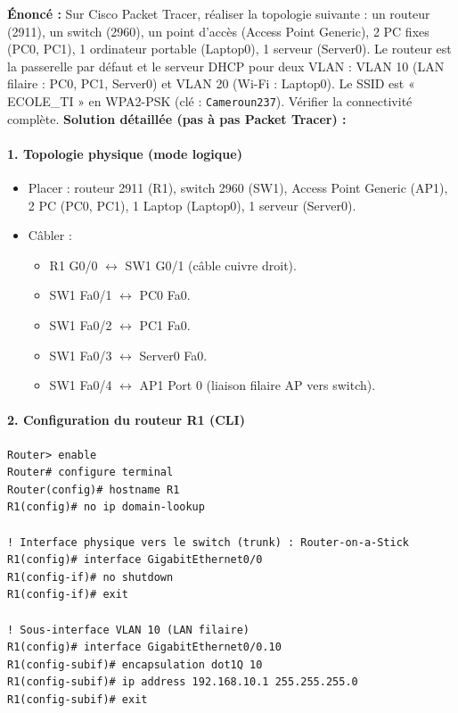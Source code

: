 \documentclass[11pt]{article}
\begin{document}
\begin{exoresolu}
\textbf{Énoncé :} Sur Cisco Packet Tracer, réaliser la topologie suivante : un routeur (2911), un switch (2960), un point d'accès (Access Point Generic), 2 PC fixes (PC0, PC1), 1 ordinateur portable (Laptop0), 1 serveur (Server0). Le routeur est la passerelle par défaut et le serveur DHCP pour deux VLAN : VLAN 10 (LAN filaire : PC0, PC1, Server0) et VLAN 20 (Wi-Fi : Laptop0). Le SSID est « ECOLE\_TI » en WPA2-PSK (clé : \texttt{Cameroun237}). Vérifier la connectivité complète.
\tcblower
\textbf{Solution détaillée (pas à pas Packet Tracer) :}

\paragraph{1. Topologie physique (mode logique)}
\begin{itemize}
    \item Placer : routeur 2911 (R1), switch 2960 (SW1), Access Point Generic (AP1), 2 PC (PC0, PC1), 1 Laptop (Laptop0), 1 serveur (Server0).
    \item Câbler :
    \begin{itemize}
        \item R1 G0/0 $\leftrightarrow$ SW1 G0/1 (câble cuivre droit).
        \item SW1 Fa0/1 $\leftrightarrow$ PC0 Fa0.
        \item SW1 Fa0/2 $\leftrightarrow$ PC1 Fa0.
        \item SW1 Fa0/3 $\leftrightarrow$ Server0 Fa0.
        \item SW1 Fa0/4 $\leftrightarrow$ AP1 Port 0 (liaison filaire AP vers switch).
    \end{itemize}
\end{itemize}

\paragraph{2. Configuration du routeur R1 (CLI)}
\begin{lstlisting}
Router> enable
Router# configure terminal
Router(config)# hostname R1
R1(config)# no ip domain-lookup

! Interface physique vers le switch (trunk) : Router-on-a-Stick
R1(config)# interface GigabitEthernet0/0
R1(config-if)# no shutdown
R1(config-if)# exit

! Sous-interface VLAN 10 (LAN filaire)
R1(config)# interface GigabitEthernet0/0.10
R1(config-subif)# encapsulation dot1Q 10
R1(config-subif)# ip address 192.168.10.1 255.255.255.0
R1(config-subif)# exit


\end{lstlisting}
\end{exoresolu}
\end{document}
